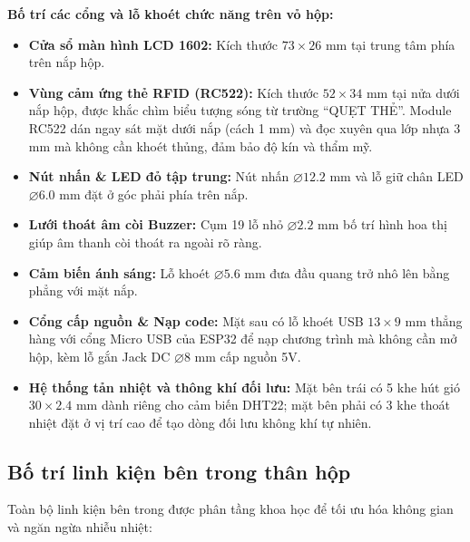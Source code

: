 \vspace{0.2cm}
\textbf{Bố trí các cổng và lỗ khoét chức năng trên vỏ hộp:}
\begin{itemize}
    \item \textbf{Cửa sổ màn hình LCD 1602:} Kích thước $73 \times 26$ mm tại trung tâm phía trên nắp hộp.
    \item \textbf{Vùng cảm ứng thẻ RFID (RC522):} Kích thước $52 \times 34$ mm tại nửa dưới nắp hộp, được khắc chìm biểu tượng sóng từ trường ``QUẸT THẺ''. Module RC522 dán ngay sát mặt dưới nắp (cách 1 mm) và đọc xuyên qua lớp nhựa 3 mm mà không cần khoét thủng, đảm bảo độ kín và thẩm mỹ.
    \item \textbf{Nút nhấn \& LED đỏ tập trung:} Nút nhấn $\varnothing 12.2$ mm và lỗ giữ chân LED $\varnothing 6.0$ mm đặt ở góc phải phía trên nắp.
    \item \textbf{Lưới thoát âm còi Buzzer:} Cụm 19 lỗ nhỏ $\varnothing 2.2$ mm bố trí hình hoa thị giúp âm thanh còi thoát ra ngoài rõ ràng.
    \item \textbf{Cảm biến ánh sáng:} Lỗ khoét $\varnothing 5.6$ mm đưa đầu quang trở nhô lên bằng phẳng với mặt nắp.
    \item \textbf{Cổng cấp nguồn \& Nạp code:} Mặt sau có lỗ khoét USB $13 \times 9$ mm thẳng hàng với cổng Micro USB của ESP32 để nạp chương trình mà không cần mở hộp, kèm lỗ gắn Jack DC $\varnothing 8$ mm cấp nguồn 5V.
    \item \textbf{Hệ thống tản nhiệt và thông khí đối lưu:} Mặt bên trái có 5 khe hút gió $30 \times 2.4$ mm dành riêng cho cảm biến DHT22; mặt bên phải có 3 khe thoát nhiệt đặt ở vị trí cao để tạo dòng đối lưu không khí tự nhiên.
\end{itemize}

\subsection{Bố trí linh kiện bên trong thân hộp}

Toàn bộ linh kiện bên trong được phân tầng khoa học để tối ưu hóa không gian và ngăn ngừa nhiễu nhiệt:

